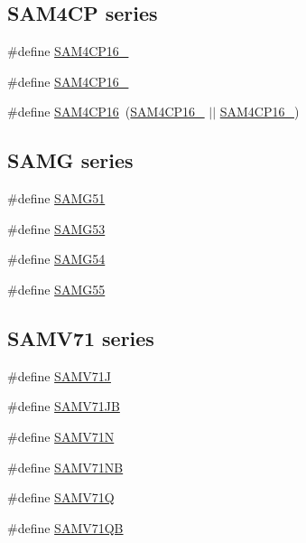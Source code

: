 \subsection*{S\+A\+M4\+CP series}
\begin{DoxyCompactItemize}
\item 
\#define \mbox{\hyperlink{group__sam__part__macros__group_gaa7359e4b343a4ab48894b656b2f349b9}{S\+A\+M4\+C\+P16\+\_}}
\item 
\#define \mbox{\hyperlink{group__sam__part__macros__group_ga6757116bcbffd58eca2b98b620175590}{S\+A\+M4\+C\+P16\+\_}}
\item 
\#define \mbox{\hyperlink{group__sam__part__macros__group_gafd1c94764b607ffb18e6a495e5486659}{S\+A\+M4\+C\+P16}}~(\mbox{\hyperlink{group__sam__part__macros__group_gaa7359e4b343a4ab48894b656b2f349b9}{S\+A\+M4\+C\+P16\+\_}} $\vert$$\vert$ \mbox{\hyperlink{group__sam__part__macros__group_ga6757116bcbffd58eca2b98b620175590}{S\+A\+M4\+C\+P16\+\_}})
\end{DoxyCompactItemize}
\subsection*{S\+A\+MG series}
\begin{DoxyCompactItemize}
\item 
\#define \mbox{\hyperlink{group__sam__part__macros__group_gacd7261d3389d2f5c745e64ffe1b89d99}{S\+A\+M\+G51}}
\item 
\#define \mbox{\hyperlink{group__sam__part__macros__group_gaee5167c2eae38c830d175d48769391d8}{S\+A\+M\+G53}}
\item 
\#define \mbox{\hyperlink{group__sam__part__macros__group_ga0cd510d1aac0c983cf19398f7dd2b6a1}{S\+A\+M\+G54}}
\item 
\#define \mbox{\hyperlink{group__sam__part__macros__group_ga80c14f26d62169592dd858e259b440de}{S\+A\+M\+G55}}
\end{DoxyCompactItemize}
\subsection*{S\+A\+M\+V71 series}
\begin{DoxyCompactItemize}
\item 
\#define \mbox{\hyperlink{group__sam__part__macros__group_gaec1e3ef31d457e77f20063cdde7e13b9}{S\+A\+M\+V71J}}
\item 
\#define \mbox{\hyperlink{group__sam__part__macros__group_ga4fbb0bc9ffb5be011f7aa7eeb9e8dd4b}{S\+A\+M\+V71\+JB}}
\item 
\#define \mbox{\hyperlink{group__sam__part__macros__group_ga8688ea299fbe00f831b4e569cf1c742c}{S\+A\+M\+V71N}}
\item 
\#define \mbox{\hyperlink{group__sam__part__macros__group_gaf052dd0a36916f7370105b557d9c2fa8}{S\+A\+M\+V71\+NB}}
\item 
\#define \mbox{\hyperlink{group__sam__part__macros__group_ga1abe2ffaaf3eebef08978f55ed456a5c}{S\+A\+M\+V71Q}}
\item 
\#define \mbox{\hyperlink{group__sam__part__macros__group_gaa2f5f7f21d9a40bcd31df4ef38838059}{S\+A\+M\+V71\+QB}}
\end{DoxyCompactItemize}
